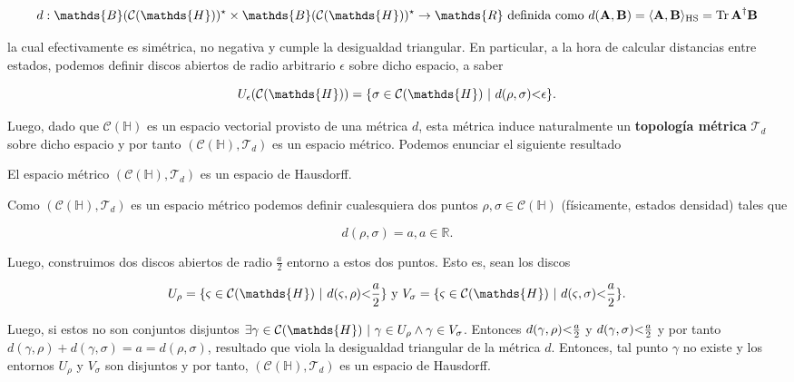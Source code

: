\documentclass{report} %
\newcommand{\lgg}{\langle}
\newcommand{\rgg}{\rangle}
\numberwithin{equation}{section}
\begin{document}
\begin{equation}
    d: \mathds{B}(\mathcal{C}(\mathds{H}))^{\star}\times \mathds{B}(\mathcal{C}(\mathds{H}))^{\star} \rightarrow \mathds{R} \textnormal{ definida como } d({\bf A}, {\bf B})=\lgg {\bf A}, {\bf B} \rgg_{\textnormal{HS}} = \Tr \textbf{A}^{\dagger} {\bf B}
\end{equation}

la cual efectivamente es simétrica, no negativa y cumple la desigualdad triangular. En particular, a la hora de calcular distancias entre estados, podemos definir discos abiertos de radio arbitrario $\epsilon$ sobre dicho espacio, a saber

$$
U_{\epsilon}(\mathcal{C}(\mathds{H})) = \{\sigma \in \mathcal{C}(\mathds{H}) \textnormal{ | } d(\rho, \sigma) \mbox{\textless} \epsilon \}.
$$

Luego, dado que $\mathcal{C}(\mathds{H})$ es un espacio vectorial provisto de una métrica $d$, esta métrica induce naturalmente un \textbf{topología métrica} $\mathcal{T}_d$ sobre dicho espacio y por tanto $(\mathcal{C}(\mathds{H}), \mathcal{T}_d)$ es un espacio métrico. Podemos enunciar el siguiente resultado 

\begin{tcolorbox}[colback=red!5!white, colframe=red!50!black, title= Topología de $\mathcal{C}(\mathds{H})$]

El espacio métrico $(\mathcal{C}(\mathds{H}), \mathcal{T}_d)$ es un espacio de Hausdorff.
\end{tcolorbox}
\begin{tcolorbox}
Como $(\mathcal{C}(\mathds{H}), \mathcal{T}_d)$ es un espacio métrico podemos definir cualesquiera dos puntos $\rho, \sigma \in \mathcal{C}(\mathds{H})$ (físicamente, estados densidad) tales que 

$$
d(\rho, \sigma) = a, a \in \mathds{R}.
$$

Luego, construimos dos discos  abiertos \cite{NakaharaM} de radio $\frac{a}{2}$ entorno a estos dos puntos. Esto es, sean los discos 

\begin{align*}
    U_{\rho} = \{\varsigma \in \mathcal{C}(\mathds{H}) \textnormal{ | } d(\varsigma, \rho) \mbox{\textless} \frac{a}{2}\} \textnormal{ y } 
    V_{\sigma} = \{\varsigma \in \mathcal{C}(\mathds{H}) \textnormal{ | } d(\varsigma, \sigma) \mbox{\textless} \frac{a}{2}\}.
\end{align*}

Luego, si estos no son conjuntos disjuntos $\exists \gamma \in \mathcal{C}(\mathds{H}) \textnormal{ | } \gamma \in U_{\rho} \land \gamma \in V_{\sigma}$. Entonces $d(\gamma,\rho) \mbox{\textless} \frac{a}{2}$ y $d(\gamma,\sigma) \mbox{\textless} \frac{a}{2}$ y por tanto $d(\gamma,\rho) + d(\gamma,\sigma) = a = d(\rho, \sigma)$, resultado que viola la desigualdad triangular de la métrica $d$. Entonces, tal punto $\gamma$ no existe y los entornos $U_{\rho}$ y $V_{\sigma}$ son disjuntos y por tanto, $(\mathcal{C}(\mathds{H}), \mathcal{T}_d)$ es un espacio de Hausdorff. 
\end{tcolorbox}
\end{document}
